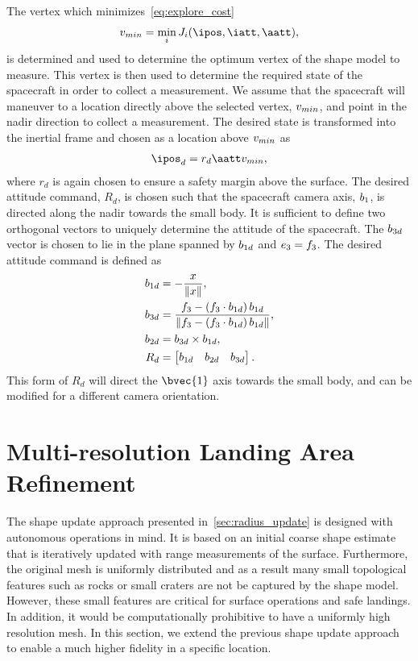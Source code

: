 \documentclass[letterpaper, paper,11pt]{AAS}		%
\begin{document}
The vertex which minimizes~\cref{eq:explore_cost} 
\begin{align*}
    \vc{v}_{min} = \min_{i} J_i(\ipos, \iatt, \aatt),
\end{align*}
is determined and used to determine the optimum vertex of the shape model to measure.
This vertex is then used to determine the required state of the spacecraft in order to collect a measurement.
We assume that the spacecraft will maneuver to a location directly above the selected vertex, \( v_{min} \), and point in the nadir direction to collect a measurement.
The desired state is transformed into the inertial frame and chosen as a location above \( v_{min} \) as
\begin{align}
    \ipos_d = r_d \aatt \vc{v}_{min}, 
\end{align}
where \( r_d \) is again chosen to ensure a safety margin above the surface.
The desired attitude command, \( R_d\), is chosen such that the spacecraft camera axis, \( b_1 \), is directed along the nadir towards the small body.
It is sufficient to define two orthogonal vectors to uniquely determine the attitude of the spacecraft.
The \( b_{3d} \) vector is chosen to lie in the plane spanned by \(b_{1d} \) and \( e_3 = f_3 \).
The desired attitude command is defined as
\begin{align}
    b_{1d} &= - \frac{x}{\left\| x \right\|} , \\
    b_{3d} &= \frac{f_3 - \left( f_3 \cdot b_{1d} \right) b_{1d}}{\left\| f_3 - \left( f_3 \cdot b_{1d} \right) b_{1d} \right\|}, \\
    b_{2d} &= b_{3d} \times b_{1d} , \\
    R_d &= \begin{bmatrix} b_{1d} & b_{2d} & b_{3d} \end{bmatrix} .
\end{align}
This form of \( R_d \) will direct the \( \bvec{1} \) axis towards the small body, and can be modified for a different camera orientation.

\section{Multi-resolution Landing Area Refinement}\label{sec:landing_refinement}

The shape update approach presented in~\cref{sec:radius_update} is designed with autonomous operations in mind. 
It is based on an initial coarse shape estimate that is iteratively updated with range measurements of the surface.
Furthermore, the original mesh is uniformly distributed and as a result many small topological features such as rocks or small craters are not be captured by the shape model. 
However, these small features are critical for surface operations and safe landings.
In addition, it would be computationally prohibitive to have a uniformly high resolution mesh.
In this section, we extend the previous shape update approach to enable a much higher fidelity in a specific location.
\end{document}
